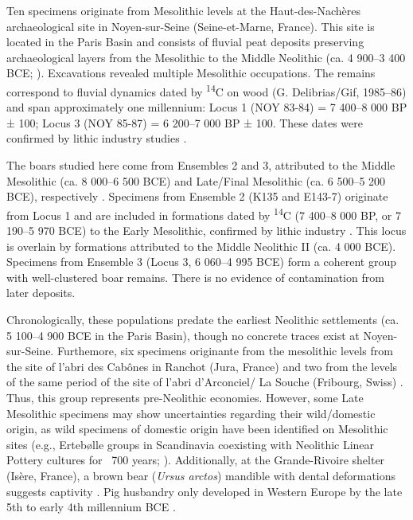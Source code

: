 \documentclass[12pt,a4paper]{article}
\begin{document}
Ten specimens originate from Mesolithic levels at the Haut-des-Nachères archaeological site in Noyen-sur-Seine (Seine-et-Marne, France). This site is located in the Paris Basin and consists of fluvial peat deposits preserving archaeological layers from the Mesolithic to the Middle Neolithic (ca. 4 900–3 400 BCE; \cite{marinval-vigneArcheologiePaleoenvironnementNoyenSeine1993g,mordantNoyenSeineVingtcinqAns2013d}). Excavations revealed multiple Mesolithic occupations. The remains correspond to fluvial dynamics dated by \textsuperscript{14}C on wood (G. Delibrias/Gif, 1985–86) and span approximately one millennium: Locus 1 (NOY 83-84) = 7 400–8 000 BP ± 100; Locus 3 (NOY 85-87) = 6 200–7 000 BP ± 100. These dates were confirmed by lithic industry studies \cite{gueretLoutillagePremierMesolithique2013,
deseineNouveauRegardOccupations2019}. 

The boars studied here come from Ensembles 2 and 3, attributed to the Middle Mesolithic (ca. 8 000–6 500 BCE) and Late/Final Mesolithic (ca. 6 500–5 200 BCE), respectively \cite{davidModelisationVegetationHolocene2014d}. Specimens from Ensemble 2 (K135 and E143-7) originate from Locus 1 and are included in formations dated by \textsuperscript{14}C (7 400–8 000 BP, or 7 190–5 970 BCE) to the Early Mesolithic, confirmed by lithic industry \cite{gueretLoutillagePremierMesolithique2013}. This locus is overlain by formations attributed to the Middle Neolithic II (ca. 4 000 BCE). Specimens from Ensemble 3 (Locus 3, 6 060–4 995 BCE) form a coherent group with well-clustered boar remains. There is no evidence of contamination from later deposits. 

Chronologically, these populations predate the earliest Neolithic settlements (ca. 5 100–4 900 BCE in the Paris Basin), though no concrete traces exist at Noyen-sur-Seine. Furthemore, six specimens originante from the mesolithic levels from the site of l’abri des Cabônes in Ranchot (Jura, France)\cite{campyRanchotAbriCabones2019} and two from the levels of the same period of the site of l'abri d'Arconciel/ La Souche (Fribourg, Swiss) \cite{castelFauneMesolithiqueLabri2020}. Thus, this group represents pre-Neolithic economies. However, some Late Mesolithic specimens may show uncertainties regarding their wild/domestic origin, as wild specimens of domestic origin have been identified on Mesolithic sites (e.g., Ertebølle groups in Scandinavia coexisting with Neolithic Linear Pottery cultures for ~700 years; \cite{krause-kyoraUseDomesticatedPigs2013, evinExploringComplexityDomestication2014,rowley-conwyMesolithicDomesticPigs2014,rowley-conwyWildBoarDomestic2014}). Additionally, at the Grande-Rivoire shelter (Isère, France), a brown bear (\textit{Ursus arctos}) mandible with dental deformations suggests captivity \cite{chaixTamedBrownBear1997}. Pig husbandry only developed in Western Europe by the late 5th to early 4th millennium BCE \cite{arbogastPremiersElevagesNeolithiques1990,tressetSubstitutionSpeciesTechniques2007,larsonAncientDNAPig2007f}.
\end{document}
